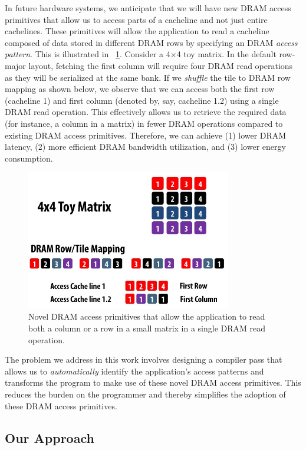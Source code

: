 \documentclass[letterpaper]{article}
\begin{document}
In future hardware systems, we anticipate that we will have new DRAM access
primitives that allow us to access parts of a cacheline and not just
entire cachelines.
These primitives will allow the application to read a cacheline
composed of data stored in different DRAM rows by specifying
an DRAM \textit{access pattern}. This is illustrated in ~\cref{fig:primitives}.
Consider a 4$\times$4 toy matrix. In the default row-major layout,
fetching the first column will require four DRAM read operations as
they will be serialized at the same bank. If we \textit{shuffle}
the tile to DRAM row mapping as shown below, we observe that we can
access both the first row (cacheline 1) and first column (denoted by, say,
cacheline 1.2) using a single DRAM read operation.
This effectively allows us to retrieve the required data (for instance, a column
in a matrix) in fewer DRAM operations compared to existing DRAM access primitives.
Therefore, we can achieve (1) lower DRAM latency, (2) more efficient DRAM
bandwidth utilization, and (3) lower energy consumption.

\begin{figure}[ht]
	\centering
	\includegraphics[width=0.8\textwidth]{images/primitives}
	\caption{Novel DRAM access primitives that allow the application to read
	both a column or a row in a small matrix in a single DRAM read operation.}
	\label{fig:primitives}
\end{figure}


The problem we address in this work involves designing a compiler pass that
allows us to \textit{automatically} identify the application's access
patterns and transforms the program to make use of these novel DRAM access
primitives.
This reduces the burden on the programmer and thereby simplifies the adoption
of these DRAM access primitives.

\subsection{Our Approach}
\end{document}
